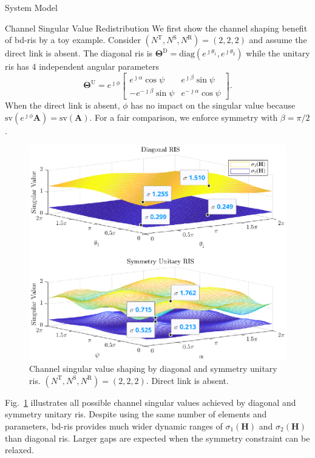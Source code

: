\documentclass[journal]{IEEEtran}
\begin{document}
\begin{section}{System Model}
	\begin{subsection}{Channel Singular Value Redistribution}
		We first show the channel shaping benefit of \gls{bd}-\gls{ris} by a toy example.
		Consider $(N^\mathrm{T}, N^\mathrm{S}, N^\mathrm{R}) = (2, 2, 2)$ and assume the direct link is absent.
		The diagonal \gls{ris} is $\mathbf{\Theta}^\mathrm{D} = \mathrm{diag}(e^{\jmath \theta_1}, e^{\jmath \theta_2})$ while the unitary \gls{ris} has 4 independent angular parameters
		\begin{equation}
			\mathbf{\Theta}^\mathrm{U} = e^{\jmath \phi} \begin{bmatrix}
				e^{\jmath \alpha} \cos \psi  & e^{\jmath \beta} \sin \psi   \\
				-e^{-\jmath \beta} \sin \psi & e^{-\jmath \alpha} \cos \psi
			\end{bmatrix}.
		\end{equation}
		When the direct link is absent, $\phi$ has no impact on the singular value because $\mathrm{sv}(e^{\jmath \phi} \mathbf{A}) = \mathrm{sv}(\mathbf{A})$.
		For a fair comparison, we enforce symmetry with $\beta = \pi / 2$.
		\begin{figure}
			\centering
			\includegraphics[width=\columnwidth]{assets/simulation/pc_singular_toy.eps}
			\caption{Channel singular value shaping by diagonal and symmetry unitary \gls{ris}. $(N^\mathrm{T}, N^\mathrm{S}, N^\mathrm{R}) = (2, 2, 2)$. Direct link is absent.}
			\label{sm:pc_singular_toy}
		\end{figure}
		Fig.~\ref{sm:pc_singular_toy} illustrates all possible channel singular values achieved by diagonal and symmetry unitary \gls{ris}.
		Despite using the same number of elements and parameters, \gls{bd}-\gls{ris} provides much wider dynamic ranges of $\sigma_1(\mathbf{H})$ and $\sigma_2(\mathbf{H})$ than diagonal \gls{ris}.
		Larger gaps are expected when the symmetry constraint can be relaxed.


\end{subsection}
\end{section}
\end{document}

